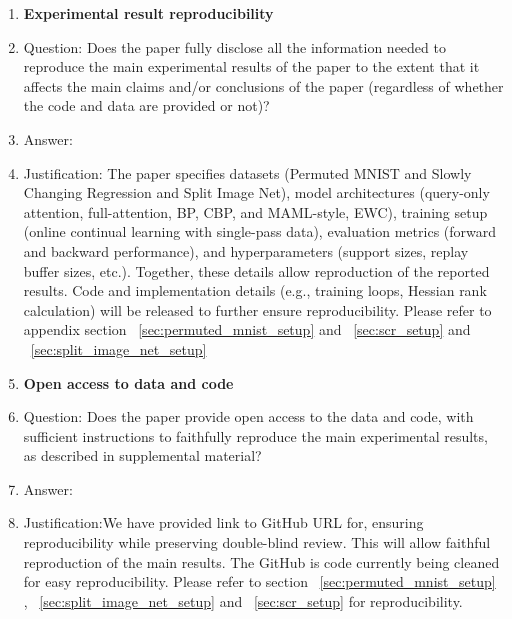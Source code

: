 \documentclass{article}
\begin{document}
\begin{enumerate}
\item {\bf Experimental result reproducibility}
    \item[] Question: Does the paper fully disclose all the information needed to reproduce the main experimental results of the paper to the extent that it affects the main claims and/or conclusions of the paper (regardless of whether the code and data are provided or not)?
    \item[] Answer: \answerYes{} %
    \item[] Justification: The paper specifies datasets (Permuted MNIST and Slowly Changing Regression and Split Image Net), model architectures (query-only attention, full-attention, BP, CBP, and MAML-style, EWC), training setup (online continual learning with single-pass data), evaluation metrics (forward and backward performance), and hyperparameters (support sizes, replay buffer sizes, etc.). Together, these details allow reproduction of the reported results. Code and implementation details (e.g., training loops, Hessian rank calculation) will be released to further ensure reproducibility. Please refer to appendix section ~\ref{sec:permuted_mnist_setup} and ~\ref{sec:scr_setup} and ~\ref{sec:split_image_net_setup}
    

\item {\bf Open access to data and code}
    \item[] Question: Does the paper provide open access to the data and code, with sufficient instructions to faithfully reproduce the main experimental results, as described in supplemental material?
    \item[] Answer: \answerYes{} %
    \item[] Justification:We have provided link to GitHub URL for, ensuring reproducibility while preserving double-blind review. This will allow faithful reproduction of the main results. The GitHub is code currently being cleaned for easy reproducibility. Please refer to section ~\ref{sec:permuted_mnist_setup} , ~\ref{sec:split_image_net_setup} and ~\ref{sec:scr_setup} for reproducibility.



\end{enumerate}
\end{document}
